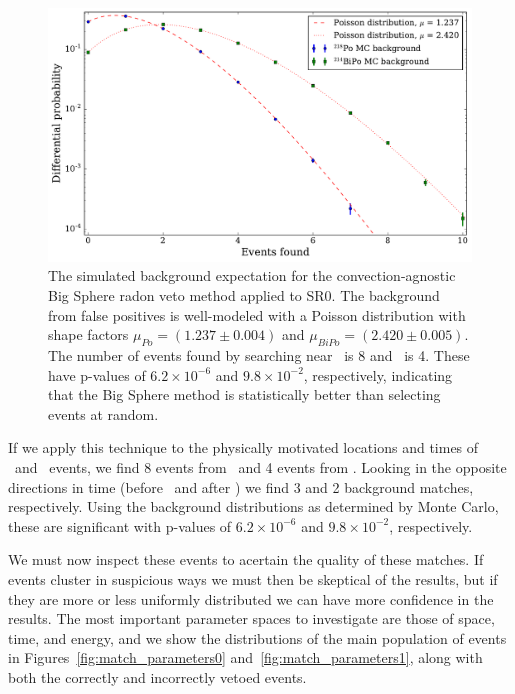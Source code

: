 \begin{figure}[htb]
\centering
    \includegraphics[width=\textwidth]{figures/rnveto/sr0_bigsphere_bkg}
    \caption{The simulated background expectation for the convection-agnostic Big Sphere radon veto method applied to SR0. The background from false positives is well-modeled with a Poisson distribution with shape factors $\mu_{Po} = (1.237 \pm 0.004)$ and $\mu_{BiPo} = (2.420 \pm 0.005)$. The number of events found by searching near \Po~is 8 and \BiPo~is 4. These have p-values of $6.2\times10^{-6}$ and $9.8\times10^{-2}$, respectively, indicating that the Big Sphere method is statistically better than selecting events at random.}\label{fig:bs_sr0}
\end{figure}

If we apply this technique to the physically motivated locations and times of \Po~and \BiPo~events, we find 8 events from \Po~and 4 events from \BiPo. Looking in the opposite directions in time (before \Po~and after \BiPo) we find 3 and 2 background matches, respectively. Using the background distributions as determined by Monte Carlo, these are significant with p-values of $6.2\times10^{-6}$ and $9.8\times10^{-2}$, respectively.

We must now inspect these events to acertain the quality of these matches. If events cluster in suspicious ways we must then be skeptical of the results, but if they are more or less uniformly distributed we can have more confidence in the results. The most important parameter spaces to investigate are those of space, time, and energy, and we show the distributions of the main population of events in Figures~\ref{fig:match_parameters0} and~\ref{fig:match_parameters1}, along with both the correctly and incorrectly vetoed events.

